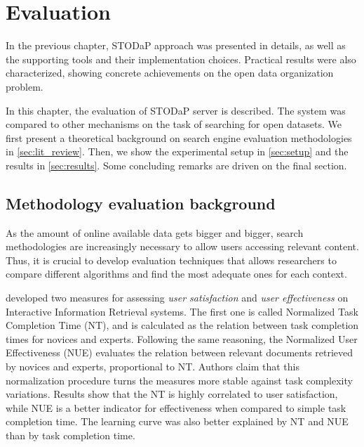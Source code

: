 \chapter{Evaluation}

In the previous chapter, STODaP approach was presented in details, as well as the supporting tools and their implementation choices.
Practical results were also characterized, showing concrete achievements on the open data organization problem.

In this chapter, the evaluation of STODaP server is described.
The system was compared to other mechanisms on the task of searching for open datasets.
We first present a theoretical background on search engine evaluation methodologies in \autoref{sec:lit_review}.
Then, we show the experimental setup in \autoref{sec:setup} and the results in \autoref{sec:results}.
Some concluding remarks are driven on the final section.

\section{Methodology evaluation background}
\label{sec:lit_review}

As the amount of online available data gets bigger and bigger, search methodologies are increasingly necessary to allow users accessing relevant content.
Thus, it is crucial to develop evaluation techniques that allows researchers to compare different algorithms and find the most adequate ones for each context.

 developed two measures for assessing \emph{user satisfaction} and \emph{user effectiveness} on Interactive Information Retrieval systems.
The first one is called Normalized Task Completion Time (NT), and is calculated as the relation between task completion times for novices and experts.
Following the same reasoning, the Normalized User Effectiveness (NUE) evaluates the relation between relevant documents retrieved by novices and experts, proportional to NT.
Authors claim that this normalization procedure turns the measures more stable against task complexity variations.
Results show that the NT is highly correlated to user satisfaction, while NUE is a better indicator for effectiveness when compared to simple task completion time.
The learning curve was also better explained by NT and NUE than by task completion time.

